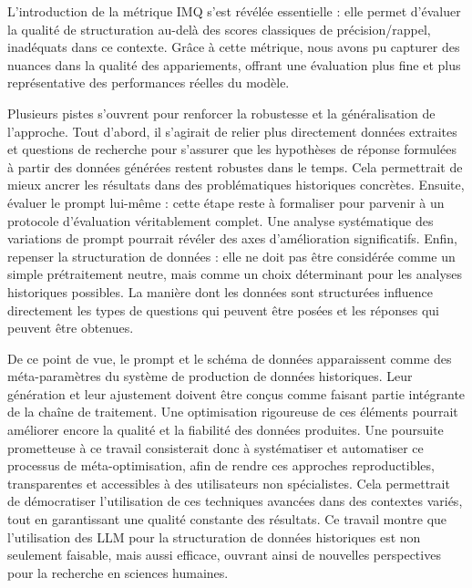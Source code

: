 L’introduction de la métrique IMQ s’est révélée essentielle : elle permet d’évaluer la qualité de structuration au-delà des scores classiques de précision/rappel, inadéquats dans ce contexte. Grâce à cette métrique, nous avons pu capturer des nuances dans la qualité des appariements, offrant une évaluation plus fine et plus représentative des performances réelles du modèle.

Plusieurs pistes s’ouvrent pour renforcer la robustesse et la généralisation de l’approche. Tout d'abord, il s'agirait de relier plus directement données extraites et questions de recherche pour s'assurer que les hypothèses de réponse formulées à partir des données générées restent robustes dans le temps. Cela permettrait de mieux ancrer les résultats dans des problématiques historiques concrètes. Ensuite, évaluer le prompt lui-même : cette étape reste à formaliser pour parvenir à un protocole d’évaluation véritablement complet. Une analyse systématique des variations de prompt pourrait révéler des axes d’amélioration significatifs. Enfin, repenser la structuration de données : elle ne doit pas être considérée comme un simple prétraitement neutre, mais comme un choix déterminant pour les analyses historiques possibles. La manière dont les données sont structurées influence directement les types de questions qui peuvent être posées et les réponses qui peuvent être obtenues.

De ce point de vue, le prompt et le schéma de données apparaissent comme des méta-paramètres du système de production de données historiques. Leur génération et leur ajustement doivent être conçus comme faisant partie intégrante de la chaîne de traitement. Une optimisation rigoureuse de ces éléments pourrait améliorer encore la qualité et la fiabilité des données produites. Une poursuite prometteuse à ce travail consisterait donc à systématiser et automatiser ce processus de méta-optimisation, afin de rendre ces approches reproductibles, transparentes et accessibles à des utilisateurs non spécialistes. Cela permettrait de démocratiser l’utilisation de ces techniques avancées dans des contextes variés, tout en garantissant une qualité constante des résultats. Ce travail montre que l’utilisation des LLM pour la structuration de données historiques est non seulement faisable, mais aussi efficace, ouvrant ainsi de nouvelles perspectives pour la recherche en sciences humaines.
